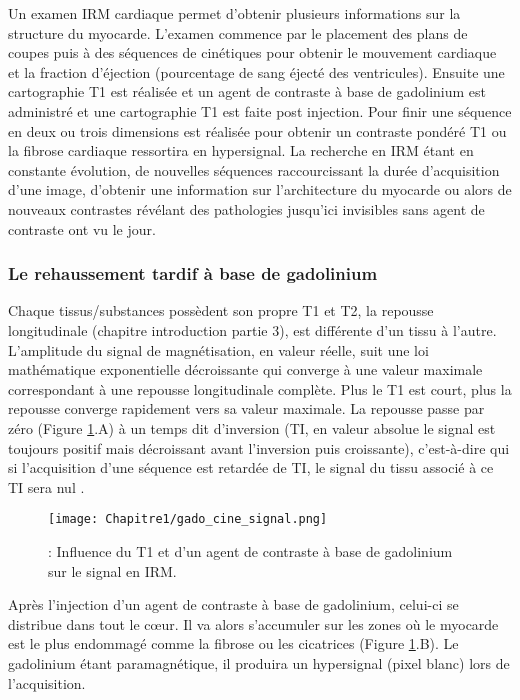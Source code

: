 Un examen IRM cardiaque permet d’obtenir plusieurs informations sur la structure du myocarde. L’examen commence par le placement des plans de coupes puis à des séquences de cinétiques pour obtenir le mouvement cardiaque et la fraction d’éjection (pourcentage de sang éjecté des ventricules). Ensuite une cartographie T1 est réalisée et un agent de contraste à base de gadolinium est administré et une cartographie T1 est faite post injection. Pour finir une séquence en deux ou trois dimensions est réalisée pour obtenir un contraste pondéré T1 ou la fibrose cardiaque ressortira en hypersignal. La recherche en IRM étant en constante évolution, de nouvelles séquences raccourcissant la durée d’acquisition d’une image, d’obtenir une information sur l’architecture du myocarde ou alors de nouveaux contrastes révélant des pathologies jusqu’ici invisibles sans agent de contraste ont vu le jour.

\subsubsection{Le rehaussement tardif à base de gadolinium }

Chaque tissus/substances possèdent son propre T1 et T2, la repousse longitudinale (chapitre introduction partie 3), est différente d’un tissu à l’autre. L’amplitude du signal de magnétisation, en valeur réelle, suit une loi mathématique exponentielle décroissante qui converge à une valeur maximale correspondant à une repousse longitudinale complète. Plus le T1 est court, plus la repousse converge rapidement vers sa valeur maximale. La repousse passe par zéro (Figure \ref{fig:gado}.A) à un temps dit d’inversion (TI, en valeur absolue le signal est toujours positif mais décroissant avant l’inversion puis croissante), c’est-à-dire qui si l’acquisition d’une séquence est retardée de TI, le signal du tissu associé à ce TI sera nul \cite{Jenista2023}.

\begin{figure}[!htbp]
  \begin{center}
    \texttt{[image: Chapitre1/gado\_cine\_signal.png]}
     \end{center}
    \caption{: Influence du T1 et d’un agent de contraste à base de gadolinium sur le signal en IRM.}
  \label{fig:gado}
\end{figure}

Après l’injection d’un agent de contraste à base de gadolinium, celui-ci se distribue dans tout le cœur. Il va alors s’accumuler sur les zones où le myocarde est le plus endommagé comme la fibrose ou les cicatrices (Figure \ref{fig:gado}.B). Le gadolinium étant paramagnétique, il produira un hypersignal (pixel blanc) lors de l’acquisition.

